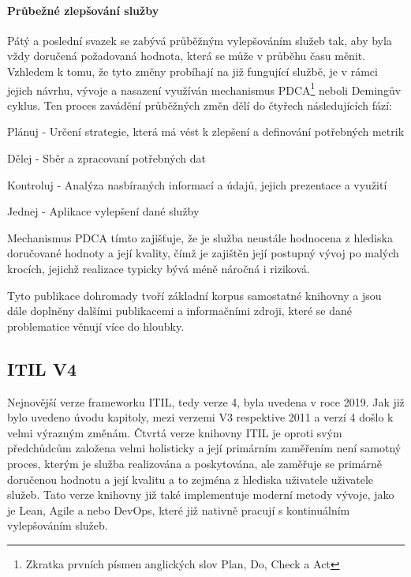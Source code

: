 \documentclass[
  digital,     %
  twoside,     %
  lof,         %
  lot,         %
]{fithesis4}
\begin{document}
\paragraph{Průbežné zlepšování služby}
Pátý a poslední svazek se zabývá průběžným vylepšováním služeb tak, aby byla vždy doručená požadovaná hodnota, která se může v průběhu času měnit. Vzhledem k tomu, že tyto změny probíhají na již fungující službě, je v rámci jejich návrhu, vývoje a nasazení využíván mechanismus PDCA\footnote{Zkratka prvních písmen anglických slov Plan, Do, Check a Act} neboli Demingův cyklus. Ten proces zavádění průběžných změn dělí do čtyřech následujících fází: \parencite[s.~38]{Matula2017}
\begin{compactitem}
    \item Plánuj - Určení strategie, která má vést k zlepšení a definování potřebných metrik
    \item Dělej - Sběr a zpracovaní potřebných dat
    \item Kontroluj - Analýza nasbíraných informací a údajů, jejich prezentace a využití
    \item Jednej - Aplikace vylepšení dané služby
\end{compactitem}
Mechanismus PDCA tímto zajišťuje, že je služba neustále hodnocena z hlediska doručované hodnoty a její kvality, čímž je zajištěn její postupný vývoj po malých krocích, jejichž realizace typicky bývá méně náročná i riziková. 

Tyto publikace dohromady tvoří základní korpus samostatné knihovny a jsou dále doplněny dalšími publikacemi a informačními zdroji, které se dané problematice věnují více do hloubky. \parencite[s.~8]{Carlidge2007}

\subsection{ITIL V4}
Nejnovější verze frameworku ITIL, tedy verze 4, byla uvedena v roce 2019. Jak již bylo uvedeno úvodu kapitoly, mezi verzemi V3 respektive 2011 a verzí 4 došlo k velmi výrazným změnám. Čtvrtá verze knihovny ITIL je oproti svým předchůdcům založena velmi holisticky a její primárním zaměřením není samotný proces, kterým je služba realizována a poskytována, ale zaměřuje se primárně doručenou hodnotu a její kvalitu a to zejména z hlediska uživatele uživatele služeb. Tato verze knihovny již také implementuje moderní metody vývoje, jako je Lean, Agile a nebo DevOps, které již nativně pracují s kontinuálním vylepšováním služeb. \parencite[s.~7]{Cartlidge2020}
\end{document}
